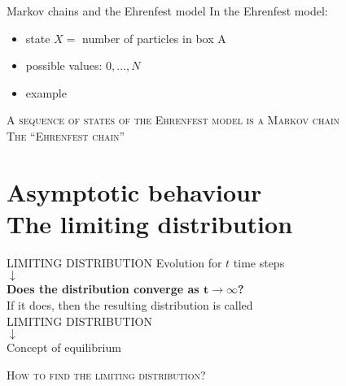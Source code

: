 \documentclass[usenames,dvipsnames]{beamer}
\begin{document}
  \begin{frame}{Markov chains and the Ehrenfest model}
    \Large In the Ehrenfest model:
    \normalsize
    \begin{itemize}
      \item<1-> state $X = $ number of particles in box A
      \item<2-> possible values: $0, \dots, N$
      \item<3-> example
    \end{itemize}
    
    \begin{figure}[r]
    \end{figure}
  \end{frame}

  \begin{frame}[standout]
    \textsc{A sequence of states of the Ehrenfest model is a Markov chain}\\
    \vspace{30pt}
    \textsc{The \enquote{Ehrenfest chain}}
  \end{frame}


  \section{Asymptotic behaviour\\\small{The limiting distribution}}
  \begin{frame}{LIMITING DISTRIBUTION}
    \centering
    Evolution for $t$ time steps\\\medskip
    $\downarrow$\\\medskip
    \large \textbf{Does the distribution converge as $\mathbf{t \rightarrow \infty}$?}\\\medskip \small If it does, then the resulting distribution is called \medskip
    \\\medskip
    \Large
    \MakeUppercase{\alert{Limiting distribution}}\\\medskip
    $\downarrow$\\\medskip
    \normalsize
    Concept of \alert{equilibrium}
  \end{frame}

  \begin{frame}
    \centering\Large
    \textsc{How to find the limiting distribution?}\\
    \vspace{30pt}
  \end{frame}
\end{document}
